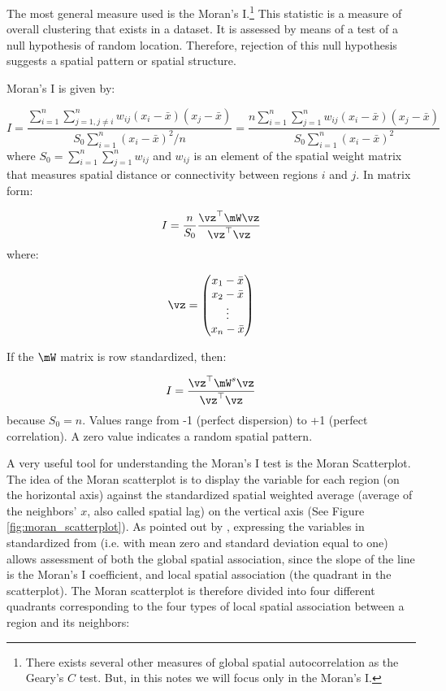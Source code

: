 \documentclass[english,12pt]{book}\usepackage[]{graphicx}\usepackage[]{xcolor}
\begin{document}
The most general measure used is the Moran's I.\footnote{There exists several other measures of global spatial autocorrelation as the Geary's $C$ test. But, in this notes we will focus only in the Moran's I.} This statistic is a measure of overall clustering that exists in a dataset. It is assessed by means of a test of a null hypothesis of random location. Therefore, rejection of this null hypothesis suggests a spatial pattern or spatial structure. 

Moran's I is given by:

\begin{equation}\label{eq:I-moran}
I = \frac{\sum_{i = 1}^n\sum_{j=1, j\neq i}^n w_{ij}\left(x_i - \bar{x}\right)\left(x_j - \bar{x}\right)}{S_0 \sum_{i = 1}^n\left(x_i - \bar{x}\right)^2/n} = \frac{n\sum_{i = 1}^n\sum_{j=1}^n w_{ij}\left(x_i - \bar{x}\right)\left(x_j - \bar{x}\right)}{S_0 \sum_{i = 1}^n\left(x_i - \bar{x}\right)^2}
\end{equation}
%
where $S_0=\sum_{i = 1}^n\sum_{j=1}^nw_{ij}$ and $w_{ij}$ is an element of the spatial weight matrix that measures spatial distance or connectivity between regions $i$ and $j$. In matrix form:


\begin{equation*}
	I = \frac{n}{S_0} \frac{\vz^\top\mW\vz}{\vz^\top\vz}
\end{equation*}
%
where: 


\begin{equation*}
\vz = \begin{pmatrix}
          x_1 - \bar{x}\\
          x_2 - \bar{x} \\
          \vdots\\
          x_n - \bar{x}
      \end{pmatrix}
\end{equation*}

If the $\mW$ matrix is row standardized, then:

\begin{equation*}
	I = \frac{\vz^\top\mW^s\vz}{\vz^\top\vz}
\end{equation*}
%
because $S_0=n$. Values range from -1 (perfect dispersion) to +1 (perfect correlation). A zero value indicates a random spatial pattern. 


A very useful tool for understanding the Moran’s I test is the Moran Scatterplot. The idea of the Moran scatterplot is to display the variable for each region (on the horizontal axis) against the standardized spatial weighted average (average of the neighbors' $x$, also called spatial lag) on the vertical axis (See Figure \ref{fig:moran_scatterplot}). As pointed out by \cite{anselin1996chapter}, expressing the variables in standardized from (i.e. with mean zero and standard deviation equal to one) allows assessment of both the global spatial association, since the slope of the line is the Moran's I coefficient, and local spatial association (the quadrant in the scatterplot). The Moran scatterplot is therefore divided into four different quadrants corresponding to the four types of local spatial association between a region and its neighbors:
\end{document}
